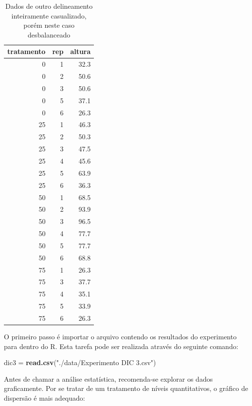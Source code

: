 \documentclass[
]{article}
\newenvironment{Shaded}{\begin{snugshade}}{\end{snugshade}}
\newcommand{\KeywordTok}[1]{\textcolor[rgb]{0.13,0.29,0.53}{\textbf{#1}}}
\newcommand{\NormalTok}[1]{#1}
\newcommand{\StringTok}[1]{\textcolor[rgb]{0.31,0.60,0.02}{#1}}
\begin{document}
\begin{table}

\caption{\label{tab:unnamed-chunk-58}Dados de outro delineamento inteiramente casualizado, porém neste caso desbalanceado}
\centering
\begin{tabular}[t]{r|r|r}
\hline
tratamento & rep & altura\\
\hline
0 & 1 & 32.3\\
\hline
0 & 2 & 50.6\\
\hline
0 & 3 & 50.6\\
\hline
0 & 5 & 37.1\\
\hline
0 & 6 & 26.3\\
\hline
25 & 1 & 46.3\\
\hline
25 & 2 & 50.3\\
\hline
25 & 3 & 47.5\\
\hline
25 & 4 & 45.6\\
\hline
25 & 5 & 63.9\\
\hline
25 & 6 & 36.3\\
\hline
50 & 1 & 68.5\\
\hline
50 & 2 & 93.9\\
\hline
50 & 3 & 96.5\\
\hline
50 & 4 & 77.7\\
\hline
50 & 5 & 77.7\\
\hline
50 & 6 & 68.8\\
\hline
75 & 1 & 26.3\\
\hline
75 & 3 & 37.7\\
\hline
75 & 4 & 35.1\\
\hline
75 & 5 & 33.9\\
\hline
75 & 6 & 26.3\\
\hline
\end{tabular}
\end{table}

O primeiro passo é importar o arquivo contendo os resultados do experimento para dentro do R. Esta tarefa pode ser realizada através do seguinte comando:

\begin{Shaded}
\begin{Highlighting}[]
\NormalTok{dic3 =}\StringTok{ }\KeywordTok{read.csv}\NormalTok{(}\StringTok{"./data/Experimento DIC 3.csv"}\NormalTok{)}
\end{Highlighting}
\end{Shaded}

Antes de chamar a análise estatística, recomenda-se explorar os dados graficamente. Por se tratar de um tratamento de níveis quantitativos, o gráfico de dispersão é mais adequado:
\end{document}
